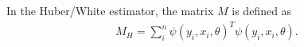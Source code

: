 In the Huber/White estimator, the matrix $M$ is defined as
\begin{align}
M_{H} = \sum_i^n \psi(y_i,x_i, \theta)^T  \psi(y_i,x_i, \theta).
\end{align}

%





